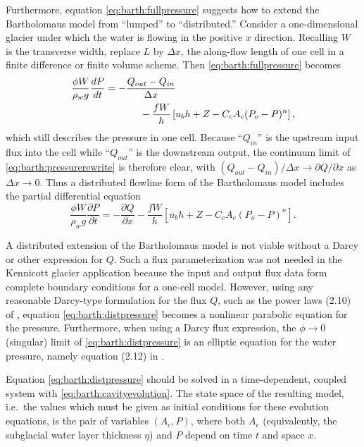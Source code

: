 \documentclass[twocolumn]{igs}
\begin{document}
Furthermore, equation \eqref{eq:barth:fullpressure} suggests how to extend the Bartholomaus model from ``lumped'' to ``distributed.''  Consider a one-dimensional glacier under which the water is flowing in the positive $x$ direction.  Recalling $W$ is the transverse width, replace $L$ by $\Delta x$, the along-flow length of one cell in a finite difference or finite volume scheme.  Then \eqref{eq:barth:fullpressure} becomes
\begin{align}
&\frac{\phi W}{\rho_w g}\frac{dP}{dt} = - \frac{Q_{out} - Q_{in}}{\Delta x}  \label{eq:barth:pressurerewrite} \\
&\qquad \qquad \qquad \quad - \frac{f W}{h} \left[u_b h + Z - C_c A_c (P_o-P)^n\right], \notag
\end{align}
which still describes the pressure in one cell.  Because ``$Q_{in}$'' is the upstream input flux into the cell while ``$Q_{out}$'' is the downstream output, the continuum limit of \eqref{eq:barth:pressurerewrite} is therefore clear, with $(Q_{out} - Q_{in})/\Delta x \to \partial Q/\partial x$ as $\Delta x \to 0$.  Thus a distributed flowline form of the Bartholomaus model includes the partial differential equation
\begin{equation}
\frac{\phi W}{\rho_w g} \frac{\partial P}{\partial t} = - \frac{\partial Q}{\partial x} - \frac{f W}{h} \left[u_b h + Z - C_c A_c (P_o-P)^n\right]. \label{eq:barth:distpressure}
\end{equation}

A distributed extension of the Bartholomaus model is not viable without a Darcy or other expression for $Q$.  Such a flux parameterization was not needed in the Kennicott glacier application because the input and output flux data form complete boundary conditions for a one-cell model.  However, using any reasonable Darcy-type formulation for the flux $Q$, such as the power laws (2.10) of \cite{Schoofetal2012}, equation \eqref{eq:barth:distpressure} becomes a nonlinear parabolic equation for the pressure.  Furthermore, when using a Darcy flux expression, the $\phi\to 0$ (singular) limit of \eqref{eq:barth:distpressure} is an elliptic equation for the water pressure, namely equation (2.12) in \cite{Schoofetal2012}.

Equation \eqref{eq:barth:distpressure} should be solved in a time-dependent, coupled system with \eqref{eq:barth:cavityevolution}.  The state space of the resulting model, i.e.~the values which must be given as initial conditions for these evolution equations, is the pair of variables $(A_c,P)$, where both $A_c$ (equivalently, the subglacial water layer thickness $\eta$) and $P$ depend on time $t$ and space $x$.
\end{document}
